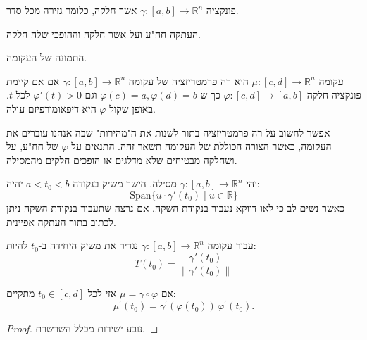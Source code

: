 \documentclass{tstextbook}
\begin{document}
\begin{definition}
פונקציה \(\gamma:[a,b]\to \mathbb{R}^{n}\) אשר חלקה, כלומר גזירה מכל סדר.

\end{definition}
\begin{definition}[דיפאומורפיזם]
העתקה חח"ע ועל אשר חלקה וההופכי שלה חלקה.

\end{definition}
\begin{definition}[מסילה]
התמונה של העקומה.

\end{definition}
\begin{definition}[רה-פרמטריזציה]
עקומה \(\mu:[c,d]\to\mathbb{R}^{n}\) היא רה פרמטריזציה של עקומה \(\gamma:[a,b]\to\mathbb{R}^{n}\) אם אם קיימת פונקציה חלקה \(\varphi:[c,d]\rightarrow[a,b]\) כך ש-\(\varphi(c)=a,\varphi(d)=b\) וגם \(\varphi'(t)> 0\) לכל \(t\). באופן שקול \(\varphi\) היא דיפאומורפיזם עולה.

\end{definition}
\begin{remark}
אפשר לחשוב על רה פרמטריזציה בתור לשנות את ה"מהירות" שבה אנחנו עוברים את העקומה, כאשר הצורה הכוללת של העקומה תשאר זהה. התנאים על \(\varphi\) של חח"ע, על ושחלקה מבטיחים שלא מדלגים או הופכים חלקים מהמסילה.

\end{remark}
\begin{definition}
יהי \(\gamma:[a,b]\to \mathbb{R}^{n}\) מסילה. הישר משיק בנקודה \(a<t_{0}<b\) יהיה:
$$\mathrm{Span}\{ u\cdot\gamma'(t_{0})\mid  u \in \mathbb{R} \}$$
כאשר נשים לב כי לאו דווקא נעבור בנקודת השקה. אם נרצה שתעבור בנקודת השקה ניתן לכתוב בתור העתקה אפיינית.

\end{definition}
\begin{definition}
עבור עקומה \(\gamma:[a,b]\to \mathbb{R}^{n}\) נגדיר את משיק היחידה ב-\(t_{0}\) להיות:
$$T(t_{0})=\frac{\gamma'(t_{0})}{\lVert \gamma'(t_{0}) \rVert }$$

\end{definition}
\begin{proposition}
אם \(\mu=\gamma \circ \varphi\) אזי לכל \(t_{0} \in [c,d]\) מתקיים:
$$\mu^{\prime}(t_{0})=\gamma^{\prime}(\varphi(t_{0}))\,\varphi^{\prime}(t_{0}).$$

\end{proposition}
\begin{proof}
נובע ישירות מכלל השרשרת.

\end{proof}
\end{document}
